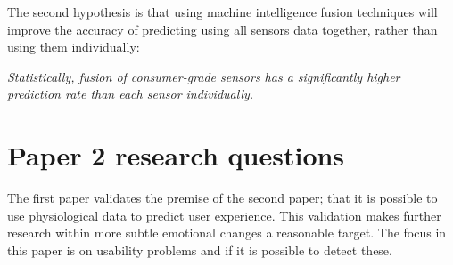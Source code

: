 The second hypothesis is that using machine intelligence fusion techniques will improve the accuracy of predicting using all sensors data together, rather than using them individually:

\textit{Statistically, fusion of consumer-grade sensors has a significantly higher prediction rate than each sensor individually.}

\section{Paper 2 research questions}
The first paper validates the premise of the second paper; that it is possible to use physiological data to predict user experience.
This validation makes further research within more subtle emotional changes a reasonable target.
The focus in this paper is on usability problems and if it is possible to detect these.
